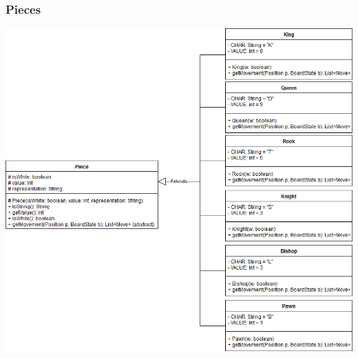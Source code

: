 \documentclass[parskip=full]{scrartcl}
\begin{document}
		\subsubsection{Pieces}
		
		\begin{minipage}{\linewidth}
		\centering
		\includegraphics[width=1\linewidth]{Diagramme/Pieces}
		\label{fig:pieces}
		\end{minipage}
\end{document}
